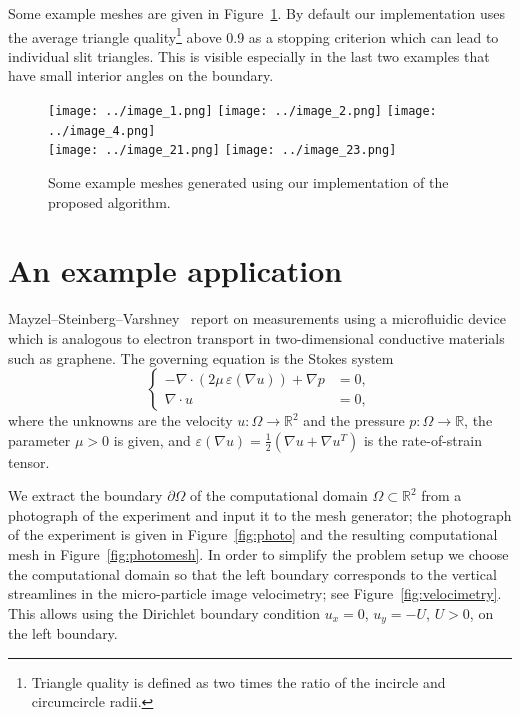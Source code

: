 \documentclass[12pt]{rmstyle}
\begin{document}
Some example meshes are given in Figure~\ref{fig:moreexamples}.  By
default our implementation uses the average triangle quality\footnote{Triangle
quality is defined as two times the ratio of the incircle and circumcircle
radii.} above 0.9 as a stopping criterion which can lead to individual slit triangles.
This is visible especially in the last two examples that have small
interior angles on the boundary.

\begin{figure}[htbp]
  \centering
  \texttt{[image: ../image\_1.png]}
  \texttt{[image: ../image\_2.png]}
  \texttt{[image: ../image\_4.png]}\\
  \texttt{[image: ../image\_21.png]}
  \texttt{[image: ../image\_23.png]}
  \caption{Some example meshes generated using our
    implementation of the proposed algorithm.}
\label{fig:moreexamples}
\end{figure}

\section{An example application}

Mayzel--Steinberg--Varshney~\cite{mayzel2019stokes} report on measurements using a
microfluidic device which is analogous to electron transport in two-dimensional
conductive materials such as graphene. The governing equation is the Stokes
system
\begin{equation}
  \left\{
  \begin{aligned}
    -\nabla \cdot (2\mu\,\varepsilon(\nabla u)) + \nabla p &= 0, \\
    \nabla \cdot u &= 0,
  \end{aligned}
  \right.
\end{equation}
where the unknowns are the velocity $u : \Omega \rightarrow \mathbb{R}^2$ and
the pressure $p : \Omega \rightarrow \mathbb{R}$, the parameter $\mu > 0$ is
given, and $\varepsilon(\nabla u) = \tfrac12(\nabla u + \nabla u^T)$ is the
rate-of-strain tensor.

We extract the boundary $\partial \Omega$ of the computational domain $\Omega
\subset \mathbb{R}^2$ from a photograph of the experiment and input it to the
mesh generator; the photograph of the experiment is given in
Figure~\ref{fig:photo} and the resulting computational mesh in
Figure~\ref{fig:photomesh}.  In order to simplify the problem setup we choose
the computational domain so that the left boundary corresponds to the vertical
streamlines in the micro-particle image velocimetry; see
Figure~\ref{fig:velocimetry}.  This allows using the Dirichlet boundary
condition $u_x = 0$, $u_y = -U$, $U > 0$, on the left boundary.
\end{document}
